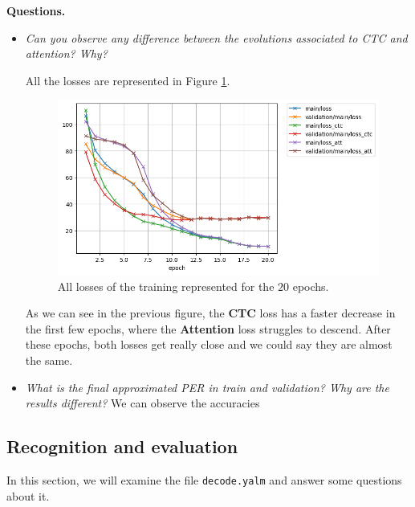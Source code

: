 \documentclass[a4paper]{article}
\def\inline{\lstinline[basicstyle=\ttfamily,keywordstyle={}]}
\begin{document}
\textbf{Questions.}
\begin{itemize}
  \item \emph{Can you observe any difference between the evolutions associated to CTC and attention? Why?}

        All the losses are represented in Figure \ref{fig:all:losses}.
        \begin{figure}[H]
          \centering
          \includegraphics[scale=0.6]{Figures/loss.png}
          \caption{All losses of the training represented for the \(20\) epochs.}
          \label{fig:all:losses}
        \end{figure}
        As we can see in the previous figure, the \textbf{CTC} loss has a faster decrease in the first few epochs, where the \textbf{Attention} loss struggles to descend. After these epochs, both losses get really close and we could say they are almost the same.
  \item \emph{What is the final approximated PER in train and validation? Why are the results different? }
        We can observe the accuracies
\end{itemize}

\subsection{Recognition and evaluation}

In this section, we will examine the file \inline{decode.yalm} and answer some questions about it.
\end{document}

